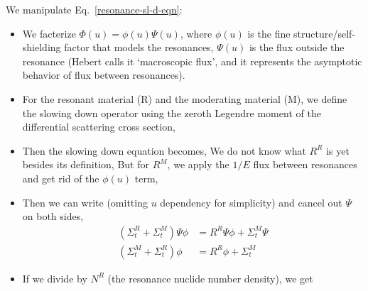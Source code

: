 \documentclass{school-22.211-notes}
\begin{document}
We manipulate Eq.~\ref{resonance-sl-d-eqn}:
\begin{itemize}
\item We facterize $\Phi(u) = \phi(u) \Psi(u)$, where $\phi(u)$ is the fine structure/self-shielding factor that models the resonances, $\Psi(u)$ is the flux outside the resonance (Hebert calls it `macroscopic flux', and it represents the asymptotic behavior of flux between resonances). 

\item For the resonant material (R) and the moderating material (M), we define the slowing down operator using the zeroth Legendre moment of the differential scattering cross section, 

\item Then the slowing down equation becomes, 
  We do not know what $R^R$ is yet besides its definition,
  But for $R^M$, we apply the $1/E$ flux between resonances and get rid of the $\phi(u)$ term, 

\item Then we can write (omitting $u$ dependency for simplicity) and cancel out $\Psi$ on both sides, 
  \begin{align}
    (\Sigma_{t}^R + \Sigma_t^M) \Psi \phi &= R^R \Psi \phi +  \Sigma_{t}^M \Psi  \\
   (\Sigma_t^M  + \Sigma_{t}^R ) \phi &=  R^R \phi + \Sigma_t^M  
  \end{align}

\item If we divide by $N^R$ (the resonance nuclide number density), we get 
\end{itemize}
\end{document}
